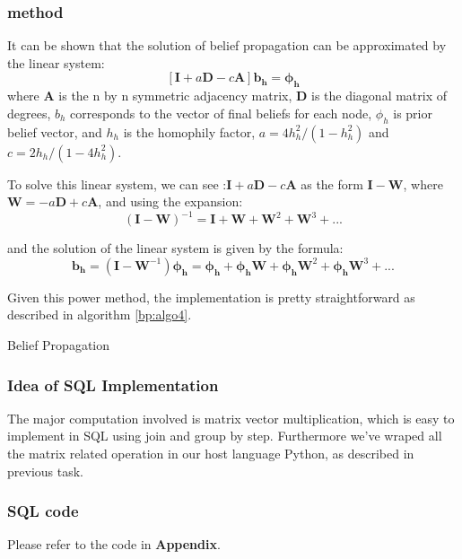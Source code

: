 \subsubsection{method}
It can be shown that the solution of belief propagation can be approximated by the linear system:$$[\mathbf{I}	 + a\mathbf{D} - c\mathbf{A}]\mathbf{b_h} = \mathbf{\phi_h}$$ 
where $\mathbf{A}$ is the n by n symmetric adjacency matrix, $\mathbf{D}$ is the diagonal matrix of degrees, $b_h$ corresponds to the vector of final beliefs for each node, $\phi_h$ is prior belief vector, and $h_h$ is the homophily factor,  $a = 4h_h^2/(1 - h_h^2)$ and $c = 2h_h / (1-4h_h^2)$.

To solve this linear system, we can see :$\mathbf{I} + a\mathbf{D} - c\mathbf{A}$ as the form $\mathbf{I} - \mathbf{W}$, where $\mathbf{W} = -a\mathbf{D} + c\mathbf{A}$, and using the expansion:$$(\mathbf{I} - \mathbf{W})^{-1} = \mathbf{I} + \mathbf{W} + \mathbf{W}^2 + \mathbf{W}^3 + ...$$

and the solution of the linear system is given by the formula:
$$\mathbf{b_h} = (\mathbf{I} - \mathbf{W}^{-1})\mathbf{\phi_h} =\mathbf{\phi_h}  + \mathbf{\phi_h} \mathbf{W} + \mathbf{\phi_h} \mathbf{W}^2 + \mathbf{\phi_h} \mathbf{W}^3 + ...$$

Given this power method, the implementation is pretty straightforward as described in algorithm \ref{bp:algo4}.
\begin{algorithm}[!htbf]
\caption{Belief Propagation}
\begin{algorithmic}
\REPEAT
{}
\end{algorithmic}
\label{bp:algo4}
\end{algorithm}

\subsubsection{Idea of SQL Implementation}
The major computation involved is matrix vector multiplication, which is easy to implement in SQL using join and group by step. Furthermore we've wraped all the matrix related operation in our host language Python, as described in previous task.

\subsubsection{SQL code}
Please refer to the code in {\bf Appendix}.

